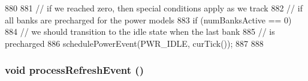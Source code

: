 \begin{DoxyCode}
880 {
881     // if we reached zero, then special conditions apply as we track
882     // if all banks are precharged for the power models
883     if (numBanksActive == 0) {
884         // we should transition to the idle state when the last bank
885         // is precharged
886         schedulePowerEvent(PWR_IDLE, curTick());
887     }
888 }
\end{DoxyCode}
\hypertarget{classDRAMCtrl_a56cadd2563b7704b3af145a6a9f5e6ea}{
\subsubsection[{processRefreshEvent}]{\setlength{\rightskip}{0pt plus 5cm}void processRefreshEvent ()}}
\label{classDRAMCtrl_a56cadd2563b7704b3af145a6a9f5e6ea}



